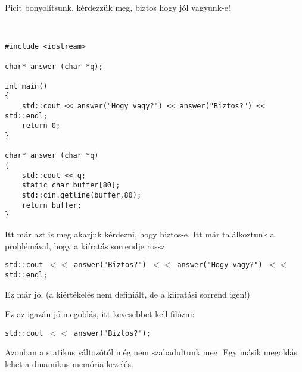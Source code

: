 \documentclass[a4paper,11.5pt]{article}
\begin{document}
	\medskip
	Picit bonyolítsunk, kérdezzük meg, biztos hogy jól vagyunk-e!
	\begin{example}\ 
		
		\begin{lstlisting}
#include <iostream>

char* answer (char *q);

int main()
{
	std::cout << answer("Hogy vagy?") << answer("Biztos?") << std::endl;
	return 0;
}

char* answer (char *q)
{
	std::cout << q;
	static char buffer[80];
	std::cin.getline(buffer,80);
	return buffer;
}
		\end{lstlisting}
		Itt már azt is meg akarjuk kérdezni, hogy biztos-e. Itt már találkoztunk a problémával, hogy a kiíratás sorrendje rossz. 
		
		\texttt{std::cout $<<$ answer("Biztos?") $<<$ answer("Hogy vagy?") $<<$ std::endl;}
		
		Ez már jó. (a kiértékelés nem definiált, de a kiíratási sorrend igen!)
		
		Ez az igazán jó megoldás, itt kevesebbet kell filózni:
		
		
		\texttt{std::cout $<<$ answer("Biztos?");}
		
	\end{example}
	
	Azonban a statikus változótól még nem szabadultunk meg. Egy másik megoldás lehet a dinamikus memória kezelés.
	\medskip
	
\end{document}

